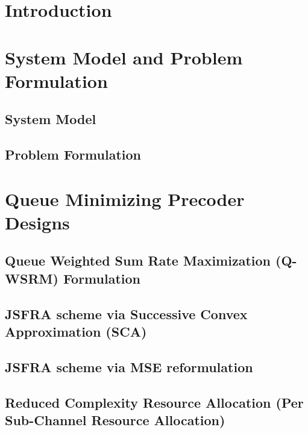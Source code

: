 \documentclass[10pt,letterpaper,journal,onecolumn]{./../Styles/IEEEtran}
\begin{document}
\begin{abstract}
%
\end{abstract}

\section{Introduction} \label{sec-1}
%

\section{System Model and Problem Formulation}
\subsection{System Model} \label{sec-2}

\subsection{Problem Formulation} \label{sec-3.2}


\section{Queue Minimizing Precoder Designs} \label{sec-3}


\subsection{Queue Weighted Sum Rate Maximization (\acs{Q-WSRM}) Formulation} \label{sec-3.1}


\subsection{\ac{JSFRA} scheme via Successive Convex Approximation (\acs{SCA})}



\subsection{\ac{JSFRA} scheme via MSE reformulation} \label{sec-3.3}


\subsection{Reduced Complexity Resource Allocation (Per Sub-Channel Resource Allocation)} \label{sec-3.4}

\end{document}
